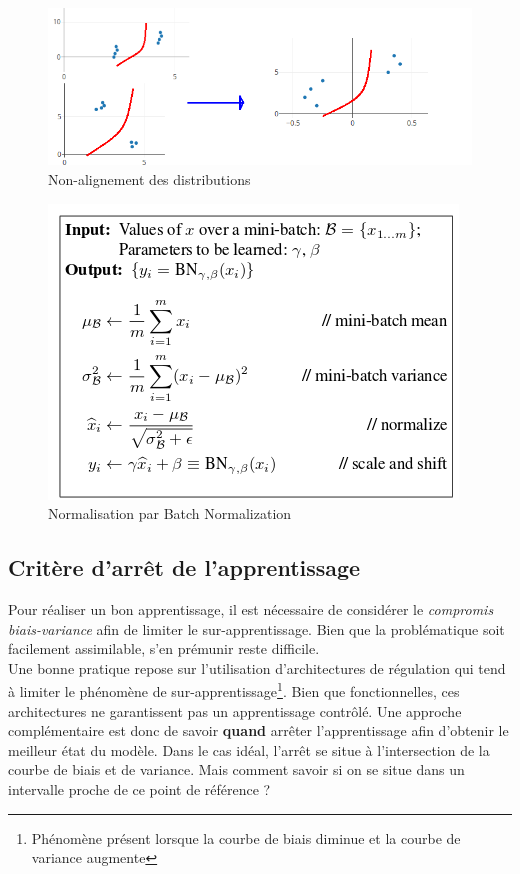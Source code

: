 \begin{figure}
    \centering
    \includegraphics[scale=0.4]{./tex/regularisation/bn1.png}
    \caption{Non-alignement des distributions}
    \label{bnex}
\end{figure}

\begin{figure}
    \centering
 \includegraphics[scale=0.4]{./tex/regularisation/batchnorm.png}
    \caption{Normalisation par Batch Normalization}
    \label{batchnorm_fig}
\end{figure}

\subsection{Critère d'arrêt de l'apprentissage}
Pour réaliser un bon apprentissage, il est nécessaire de considérer le \textit{compromis biais-variance} afin de limiter le sur-apprentissage. Bien que la problématique soit facilement assimilable, s'en prémunir reste difficile.\\

\noindent Une bonne pratique repose sur l'utilisation d'architectures de régulation qui tend à limiter le phénomène de sur-apprentissage\footnote{Phénomène présent lorsque la courbe de biais diminue et la courbe de variance augmente}. Bien que fonctionnelles, ces architectures ne garantissent pas un apprentissage contrôlé. Une approche complémentaire est donc de savoir \textbf{quand} arrêter l'apprentissage afin d'obtenir le meilleur état du modèle. Dans le cas idéal, l'arrêt se situe à l'intersection de la courbe de biais et de variance. Mais comment savoir si on se situe dans un intervalle proche de ce point de référence ?\\

